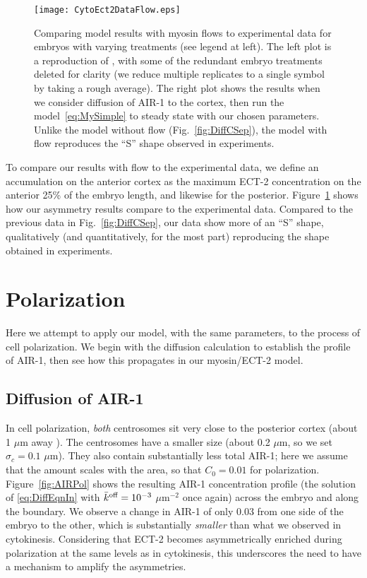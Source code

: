 \documentclass[11pt]{article}
\begin{document}
\begin{figure}
\centering
\texttt{[image: CytoEct2DataFlow.eps]}
\caption{\label{fig:ExpFlow} Comparing model results with myosin flows to experimental data for embryos with varying treatments (see legend at left). The left plot is a reproduction of \cite[Fig.~7A]{longhini2022aurora}, with some of the redundant embryo treatments deleted for clarity (we reduce multiple replicates to a single symbol by taking a rough average). The right plot shows the results when we consider diffusion of AIR-1 to the cortex, then run the model\ \eqref{eq:MySimple} to steady state with our chosen parameters. Unlike the model without flow (Fig.\ \ref{fig:DiffCSep}), the model with flow reproduces the ``S'' shape observed in experiments.}
\end{figure}

To compare our results with flow to the experimental data, we define an accumulation on the anterior cortex as the maximum ECT-2 concentration on the anterior 25\% of the embryo length, and likewise for the posterior. Figure\ \ref{fig:ExpFlow} shows how our asymmetry results compare to the experimental data. Compared to the previous data in Fig.\ \ref{fig:DiffCSep}, our data show more of an ``S'' shape, qualitatively (and quantitatively, for the most part) reproducing the shape obtained in experiments.

\section{Polarization}
Here we attempt to apply our model, with the same parameters, to the process of cell polarization. We begin with the diffusion calculation to establish the profile of AIR-1, then see how this propagates in our myosin/ECT-2 model.

\subsection{Diffusion of AIR-1 \label{sec:airpol}}
In cell polarization, \emph{both} centrosomes sit very close to the posterior cortex (about 1 $\mu$m away \cite{cowan2004centrosomes}). The centrosomes have a smaller size (about 0.2 $\mu$m, so we set $\sigma_c=0.1$ $\mu$m). They also contain substantially less total AIR-1; here we assume that the amount scales with the area, so that $C_0=0.01$ for polarization. Figure\ \ref{fig:AIRPol} shows the resulting AIR-1 concentration profile (the solution of \eqref{eq:DiffEqnIn} with $\bar{k}^\text{off}=10^{-3}$ $\mu$m$^{-2}$ once again) across the embryo and along the boundary. We observe a change in AIR-1 of only 0.03 from one side of the embryo to the other, which is substantially \emph{smaller} than what we observed in cytokinesis. Considering that ECT-2 becomes asymmetrically enriched during polarization at the same levels as in cytokinesis, this underscores the need to have a mechanism to amplify the asymmetries. 
\end{document}
